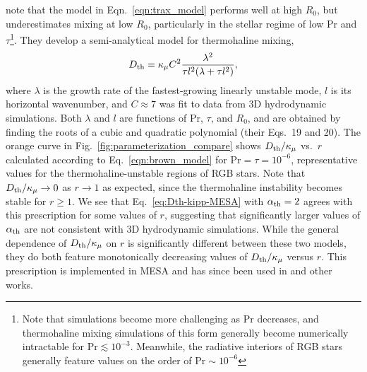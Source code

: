 \citet{brown_etal_2013} note that the model in Eqn.~\eqref{eqn:trax_model} performs well at high $R_0$, but underestimates mixing at low $R_0$, particularly in the stellar regime of low Pr and $\tau$\footnote{Note that simulations become more challenging as $\mathrm{Pr}$ decreases, and thermohaline mixing simulations of this form generally become numerically intractable for $\mathrm{Pr} \lesssim 10^{-3}$. Meanwhile, the radiative interiors of RGB stars generally feature values on the order of $\mathrm{Pr} \sim 10^{-6}$}.
They develop a semi-analytical model for thermohaline mixing,
\begin{equation}
    \Dth = \kappa_{\mu}C^2\frac{\lambda^2}{\tau l^2(\lambda + \tau l^2)},
    \label{eqn:brown_model}
\end{equation}
where $\lambda$ is the growth rate of the fastest-growing linearly unstable mode, $l$ is its horizontal wavenumber, and $C \approx 7$ was fit to data from 3D hydrodynamic simulations.
Both $\lambda$ and $l$ are functions of $\mathrm{Pr}$, $\tau$, and $R_0$, and are obtained by finding the roots of a cubic and quadratic polynomial (their Eqs.~19 and 20).
The orange curve in Fig.~\ref{fig:parameterization_compare} shows $D_\mathrm{th}/\kappa_\mu$ vs.~$r$ calculated according to Eq.~\eqref{eqn:brown_model} for $\mathrm{Pr} = \tau = 10^{-6}$, representative values for the thermohaline-unstable regions of RGB stars. 
Note that $D_\mathrm{th}/\kappa_\mu \to 0$ as $r \to 1$ as expected, since the thermohaline instability becomes stable for $r \geq 1$.
We see that Eq.~\eqref{eq:Dth-kipp-MESA} with $\alpha_{\rm{th}} = 2$ agrees with this prescription for some values of $r$, suggesting that significantly larger values of $\alpha_{\rm{th}}$ are not consistent with 3D hydrodynamic simulations. 
While the general dependence of $D_\mathrm{th}/\kappa_\mu$ on $r$ is significantly different between these two models, they do both feature monotonically decreasing values of $D_\mathrm{th}/\kappa_\mu$ versus $r$. 
This prescription is implemented in MESA and has since been used in \citep{bauer_bildsten_2019} and other works. %

